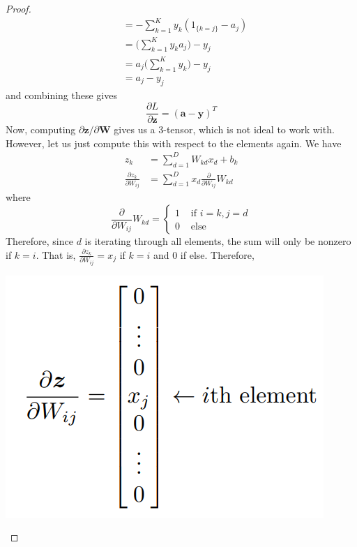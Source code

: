 \begin{proof}
\begin{align*}
      & = - \sum_{k=1}^K y_k (1_{\{k = j\}} - a_j) \\
      & = \bigg( \sum_{k=1}^K y_k a_j \bigg) - y_j \\
      & = a_j \bigg( \sum_{k=1}^K y_k \bigg) - y_j \\
      & = a_j - y_j
    \end{align*}
    and combining these gives 
    \begin{equation}
      \frac{\partial L}{\partial \mathbf{z}} = (\mathbf{a} - \mathbf{y})^T
    \end{equation}
    Now, computing $\partial \mathbf{z} / \partial \mathbf{W}$ gives us a $3$-tensor, which is not ideal to work with. However, let us just compute this with respect to the elements again. We have 
    \begin{align*}
      z_k & = \sum_{d=1}^D W_{kd} x_d + b_k \\ 
      \frac{\partial z_k}{\partial W_{ij}} & = \sum_{d=1}^D x_d \frac{\partial}{\partial W_{ij}} W_{kd}
    \end{align*}
    where 
    \begin{equation}
      \frac{\partial}{\partial W_{ij}} W_{kd} = \begin{cases} 1 & \text{ if } i = k, j = d \\ 0 & \text{ else} \end{cases}
    \end{equation}
    Therefore, since $d$ is iterating through all elements, the sum will only be nonzero if $k = i$. That is, $\frac{\partial z_k}{\partial W_{ij}} = x_j$ if $k = i$ and $0$ if else. Therefore, 
    \begin{center}
      \includegraphics[scale=0.3]{img/softmax_deriv.png}

\end{center}
\end{proof}
